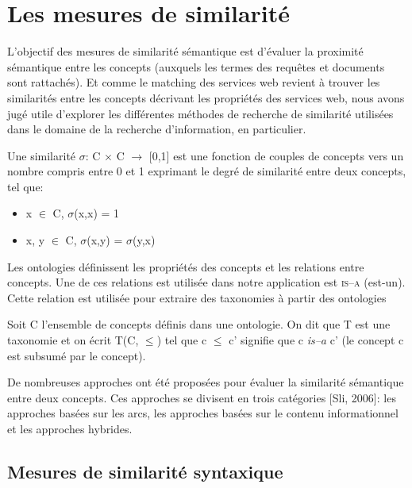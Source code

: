 \chapter{Les mesures de similarité}
\label{annexe:similarity-measurement}

L'objectif des mesures de similarité sémantique est d'évaluer la
proximité sémantique entre les concepts (auxquels les termes des
requêtes et documents sont rattachés). Et comme le matching des
services web revient à trouver les similarités entre les concepts
décrivant les propriétés des services web, nous avons jugé utile
d'explorer les différentes méthodes de recherche de similarité
utilisées dans le domaine de la recherche d’information, en
particulier.

\begin{mydef}
  Une similarité $\sigma$: C $\times$ C $\rightarrow$ [0,1] est une
  fonction de couples de concepts vers un nombre compris entre 0 et 1
  exprimant le degré de similarité entre deux concepts, tel que:
  \SpecialItem
  \begin{itemize}
  \item x $\in$ C, $\sigma$(x,x) = 1
  \item x, y $\in$ C, $\sigma$(x,y) = $\sigma$(y,x)
  \end{itemize}
\end{mydef}

Les ontologies définissent les propriétés des concepts et les
relations entre concepts. Une de ces relations est utilisée dans notre
application est \textsc{is–a} (est-un). Cette relation est utilisée
pour extraire des taxonomies à partir des ontologies

\begin{mydef}
  Soit C l'ensemble de concepts définis dans une ontologie. On dit que
  T est une taxonomie et on écrit T(C, $\leq$) tel que c $\leq$ c'
  signifie que c \textit{is–a} c' (le concept c est subsumé par le
  concept).
\end{mydef}

De nombreuses approches ont été proposées pour évaluer la similarité
sémantique entre deux concepts. Ces approches se divisent en trois
catégories [Sli, 2006]: les approches basées sur les arcs, les
approches basées sur le contenu informationnel et les approches
hybrides.

\section{Mesures de similarité syntaxique}
\label{sec:syntactic-sim}

